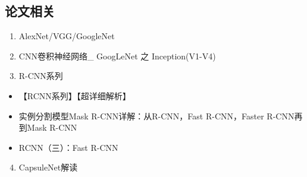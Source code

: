 \documentclass[letterpaper,10pt,english]{sphinxmanual}
\begin{document}
\subsection{论文相关}
\label{\detokenize{else/01_interview:id5}}\begin{enumerate}
\item {} 
AlexNet/VGG/GoogleNet

\end{enumerate}
\begin{quote}

\end{quote}
\begin{enumerate}
\setcounter{enumi}{1}
\item {} 
CNN卷积神经网络\_ GoogLeNet 之 Inception(V1-V4)

\end{enumerate}
\begin{quote}

\end{quote}
\begin{enumerate}
\setcounter{enumi}{2}
\item {} 
R-CNN系列

\end{enumerate}
\begin{itemize}
\item {} 
【RCNN系列】【超详细解析】
\begin{quote}

\end{quote}

\item {} 
实例分割模型Mask R-CNN详解：从R-CNN，Fast R-CNN，Faster R-CNN再到Mask R-CNN
\begin{quote}

\end{quote}

\item {} 
RCNN（三）：Fast R-CNN
\begin{quote}

\end{quote}

\end{itemize}
\begin{enumerate}
\setcounter{enumi}{3}
\item {} 
CapsuleNet解读

\end{enumerate}
\begin{quote}

\end{quote}
\end{document}
